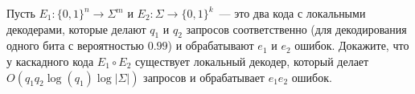 Пусть $E_1\colon \{0, 1\}^n \to \Sigma^m$ и $E_2\colon \Sigma \to \{0, 1\}^k$~--- это два кода с
локальными декодерами, которые делают $q_1$ и $q_2$ запросов соответственно (для декодирования одного
бита с вероятностью $0.99$) и обрабатывают $e_1$ и $e_2$ ошибок. Докажите, что у каскадного кода $E_1
\circ E_2$ существует локальный декодер, который делает $O(q_1 q_2 \log (q_1) \log |\Sigma|)$ запросов и
обрабатывает $e_1 e_2$ ошибок.